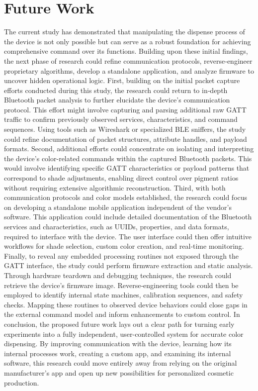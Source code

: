 \section{Future Work}
The current study has demonstrated that manipulating the dispense process of the device is not only possible but can serve as a robust foundation for achieving comprehensive command over its functions. Building upon these initial findings, the next phase of research could refine communication protocols, reverse‑engineer proprietary algorithms, develop a standalone application, and analyze firmware to uncover hidden operational logic.
First, building on the initial packet capture efforts conducted during this study, the research could return to in‑depth Bluetooth packet analysis to further elucidate the device’s communication protocol. This effort might involve capturing and parsing additional raw GATT traffic to confirm previously observed services, characteristics, and command sequences. Using tools such as Wireshark or specialized BLE sniffers, the study could refine documentation of packet structures, attribute handles, and payload formats. 
Second, additional efforts could concentrate on isolating and interpreting the device’s color-related commands within the captured Bluetooth packets. This would involve identifying specific GATT characteristics or payload patterns that correspond to shade adjustments, enabling direct control over pigment ratios without requiring extensive algorithmic reconstruction.
Third, with both communication protocols and color models established, the research could focus on developing a standalone mobile application independent of the vendor’s software. This application could include detailed documentation of the Bluetooth services and characteristics, such as UUIDs, properties, and data formats, required to interface with the device. The user interface could then offer intuitive workflows for shade selection, custom color creation, and real‑time monitoring.
Finally, to reveal any embedded processing routines not exposed through the GATT interface, the study could perform firmware extraction and static analysis. Through hardware teardown and debugging techniques, the research could retrieve the device’s firmware image. Reverse‑engineering tools could then be employed to identify internal state machines, calibration sequences, and safety checks. Mapping these routines to observed device behaviors could close gaps in the external command model and inform enhancements to custom control.
In conclusion, the proposed future work lays out a clear path for turning early experiments into a fully independent, user-controlled system for accurate color dispensing. By improving communication with the device, learning how its internal processes work, creating a custom app, and examining its internal software, this research could move entirely away from relying on the original manufacturer’s app and open up new possibilities for personalized cosmetic production.



